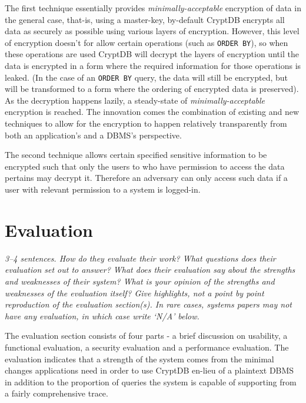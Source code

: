 \documentclass[11pt]{article}
\begin{document}
The first technique essentially provides \textit{minimally-acceptable}
encryption of data in the general case, that-is, using a master-key, by-default
CryptDB encrypts all data as securely as possible using various layers of
encryption. However, this level of encryption doesn't for allow certain
operations (such as \texttt{ORDER BY}), so when these operations are used
CryptDB will decrypt the layers of encryption until the data is encrypted in a
form where the required information for those operations is leaked. (In the
case of an \texttt{ORDER BY} query, the data will still be encrypted, but will
be transformed to a form where the ordering of encrypted data is preserved). As
the decryption happens lazily, a steady-state of \textit{minimally-acceptable}
encryption is reached. The innovation comes the combination of existing and new
techniques to allow for the encryption to happen relatively transparently from
both an application's and a DBMS's perspective.

The second technique allows certain specified sensitive information to be
encrypted such that only the users to who have permission to access the data
pertains may decrypt it. Therefore an adversary can only access such data if a
user with relevant permission to a system is logged-in.


\section*{Evaluation}

\textsl{3--4 sentences. How do they evaluate their work? What questions does
their evaluation set out to answer? What does their evaluation say about the
strengths and weaknesses of their system? What is your opinion of the strengths
and weaknesses of the evaluation itself? Give highlights, not a point by point
reproduction of the evaluation section(s). In rare cases, systems papers may
not have any evaluation, in which case write `N/A' below.}

The evaluation section consists of four parts - a brief discussion on
usability, a functional evaluation, a security evaluation and a performance
evaluation. The evaluation indicates that a strength of the system comes from
the minimal changes applications need in order to use CryptDB en-lieu of a
plaintext DBMS in addition to the proportion of queries the system is capable
of supporting from a fairly comprehensive trace.

\end{document}
